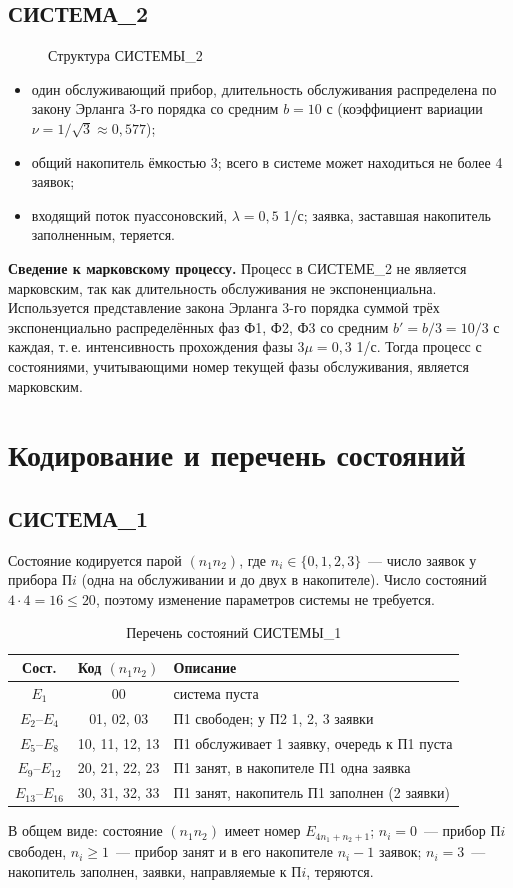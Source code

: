 \documentclass[12pt,a4paper]{article}
\begin{document}
\subsection{СИСТЕМА\_2}
\begin{figure}[H]\centering\schemeTwo\caption{Структура СИСТЕМЫ\_2}\end{figure}
\begin{itemize}
\item один обслуживающий прибор, длительность обслуживания распределена по закону Эрланга 3-го порядка со средним $b = 10$ с (коэффициент вариации $\nu = 1/\sqrt{3} \approx 0{,}577$);
\item общий накопитель ёмкостью 3; всего в системе может находиться не более 4 заявок;
\item входящий поток пуассоновский, $\lambda = 0{,}5$ 1/с; заявка, заставшая накопитель заполненным, теряется.
\end{itemize}

\textbf{Сведение к марковскому процессу.} Процесс в СИСТЕМЕ\_2 не является марковским, так как длительность
обслуживания не экспоненциальна. Используется представление закона Эрланга 3-го порядка суммой трёх
экспоненциально распределённых фаз Ф1, Ф2, Ф3 со средним $b' = b/3 = 10/3$ с каждая, т.\,е.
интенсивность прохождения фазы $3\mu = 0{,}3$ 1/с. Тогда процесс с состояниями, учитывающими номер
текущей фазы обслуживания, является марковским.

\section{Кодирование и перечень состояний}
\subsection{СИСТЕМА\_1}
Состояние кодируется парой $(n_1 n_2)$, где $n_i \in \{0,1,2,3\}$~--- число заявок у прибора П$i$
(одна на обслуживании и до двух в накопителе). Число состояний $4\cdot 4 = 16 \le 20$, поэтому
изменение параметров системы не требуется.

\begin{table}[H]
\centering\small
\caption{Перечень состояний СИСТЕМЫ\_1}
\begin{tabular}{cc l}
\toprule
Сост. & Код $(n_1 n_2)$ & Описание \\
\midrule
$E_1$ & 00 & система пуста \\
$E_2$–$E_4$ & 01, 02, 03 & П1 свободен; у П2 1, 2, 3 заявки \\
$E_5$–$E_8$ & 10, 11, 12, 13 & П1 обслуживает 1 заявку, очередь к П1 пуста \\
$E_9$–$E_{12}$ & 20, 21, 22, 23 & П1 занят, в накопителе П1 одна заявка \\
$E_{13}$–$E_{16}$ & 30, 31, 32, 33 & П1 занят, накопитель П1 заполнен (2 заявки) \\
\bottomrule
\end{tabular}
\end{table}
В общем виде: состояние $(n_1 n_2)$ имеет номер $E_{4n_1+n_2+1}$; $n_i=0$~--- прибор П$i$ свободен,
$n_i\ge1$~--- прибор занят и в его накопителе $n_i-1$ заявок; $n_i=3$~--- накопитель заполнен,
заявки, направляемые к П$i$, теряются.
\end{document}
